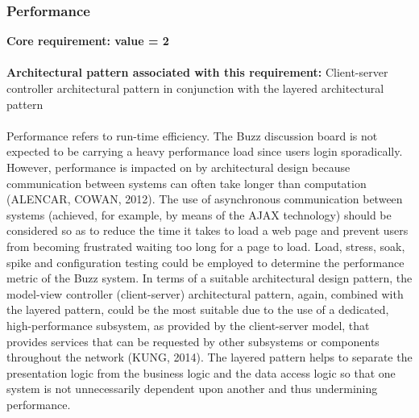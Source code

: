 \documentclass[a4paper]{article}
\begin{document}
\subsubsection{Performance}
\textbf{Core requirement: value = 2}
\\
\\\textbf{Architectural pattern associated with this requirement:} Client-server controller architectural pattern in conjunction with the layered architectural pattern
\\
\\Performance refers to run-time efficiency. The Buzz discussion board is not expected to be carrying a heavy performance load since users login sporadically. However, performance is impacted on by architectural design because communication between systems can often take longer than computation (ALENCAR, COWAN, 2012). The use of asynchronous communication between systems (achieved, for example, by means of the AJAX technology) should be considered so as to reduce the time it takes to load a web page and prevent users from becoming frustrated waiting too long for a page to load. Load, stress, soak, spike and configuration testing could be employed to determine the performance metric of the Buzz system. In terms of a suitable architectural design pattern, the model-view controller (client-server) architectural pattern, again, combined with the layered pattern, could be the most suitable due to the use of a dedicated, high-performance subsystem, as provided by the client-server model, that provides services that can be requested by other subsystems or components throughout the network (KUNG, 2014). The layered pattern helps to separate the presentation logic from the business logic and the data access logic so that one system is not unnecessarily dependent upon another and thus undermining performance.
\end{document}
